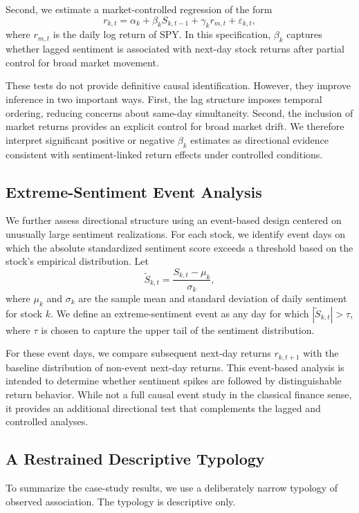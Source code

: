 \documentclass[lettersize,journal]{IEEEtran}
\begin{document}
Second, we estimate a market-controlled regression of the form
\begin{equation}
r_{k,t} = \alpha_k + \beta_k S_{k,t-1} + \gamma_k r_{m,t} + \varepsilon_{k,t},
\label{eq:controlled_reg}
\end{equation}
where $r_{m,t}$ is the daily log return of SPY. In this specification, $\beta_k$ captures whether lagged sentiment is associated with next-day stock returns after partial control for broad market movement.

These tests do not provide definitive causal identification. However, they improve inference in two important ways. First, the lag structure imposes temporal ordering, reducing concerns about same-day simultaneity. Second, the inclusion of market returns provides an explicit control for broad market drift. We therefore interpret significant positive or negative $\beta_k$ estimates as directional evidence consistent with sentiment-linked return effects under controlled conditions.

\subsection{Extreme-Sentiment Event Analysis}
We further assess directional structure using an event-based design centered on unusually large sentiment realizations. For each stock, we identify event days on which the absolute standardized sentiment score exceeds a threshold based on the stock's empirical distribution. Let
\begin{equation}
\tilde{S}_{k,t} = \frac{S_{k,t} - \mu_k}{\sigma_k},
\end{equation}
where $\mu_k$ and $\sigma_k$ are the sample mean and standard deviation of daily sentiment for stock $k$. We define an extreme-sentiment event as any day for which $|\tilde{S}_{k,t}| > \tau$, where $\tau$ is chosen to capture the upper tail of the sentiment distribution.

For these event days, we compare subsequent next-day returns $r_{k,t+1}$ with the baseline distribution of non-event next-day returns. This event-based analysis is intended to determine whether sentiment spikes are followed by distinguishable return behavior. While not a full causal event study in the classical finance sense, it provides an additional directional test that complements the lagged and controlled analyses.

\subsection{A Restrained Descriptive Typology}
To summarize the case-study results, we use a deliberately narrow typology of observed association. The typology is descriptive only.
\end{document}
